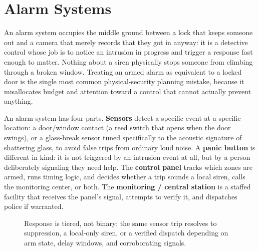 \section{Alarm Systems}

An alarm system occupies the middle ground between a lock that keeps someone out and a camera
that merely records that they got in anyway: it is a detective control whose job is to notice an
intrusion in progress and trigger a response fast enough to matter. Nothing about a siren
physically stops someone from climbing through a broken window. Treating an armed alarm as
equivalent to a locked door is the single most common physical-security planning mistake, because
it misallocates budget and attention toward a control that cannot actually prevent anything.

An alarm system has four parts. \textbf{Sensors} detect a specific event at a specific
location: a door/window contact (a reed switch that opens when the door swings), or a
glass-break sensor tuned specifically to the acoustic signature of shattering glass, to avoid
false trips from ordinary loud noise. A \textbf{panic button} is different in kind: it is not
triggered by an intrusion event at all, but by a person deliberately signaling they need help. The
\textbf{control panel} tracks which zones are armed, runs timing logic, and decides whether a trip
sounds a local siren, calls the monitoring center, or both. The \textbf{monitoring / central
station} is a staffed facility that receives the panel's signal, attempts to verify it, and
dispatches police if warranted.

\begin{figure}[h]
\centering
{}
\caption{Response is tiered, not binary: the same sensor trip resolves to suppression,
a local-only siren, or a verified dispatch depending on arm state, delay windows, and
corroborating signals.}
\label{fig:2.4-alarm-tiers}
\end{figure}

